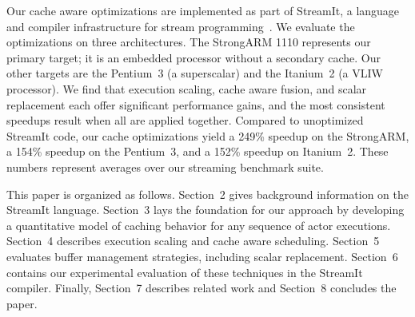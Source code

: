 \documentclass{sigplanconf}
\begin{document}
Our cache aware optimizations are implemented as part of StreamIt, a
language and compiler infrastructure for stream
programming~\cite{streamitcc}.  We evaluate the optimizations on three
architectures.  The StrongARM 1110 represents our primary target; it
is an embedded processor without a secondary cache.  Our other targets
are the Pentium~3 (a superscalar) and the Itanium~2 (a VLIW
processor).  We find that execution scaling, cache aware fusion, and
scalar replacement each offer significant performance gains, and the
most consistent speedups result when all are applied together.
Compared to unoptimized StreamIt code, our cache optimizations yield a
249\% speedup on the StrongARM, a 154\% speedup on the Pentium~3, and
a 152\% speedup on Itanium~2.  These numbers represent averages over
our streaming benchmark suite.

This paper is organized as follows.  Section~2 gives background
information on the StreamIt language.  Section~3 lays the foundation
for our approach by developing a quantitative model of caching
behavior for any sequence of actor executions.  Section~4 describes
execution scaling and cache aware scheduling.  Section~5 evaluates
buffer management strategies, including scalar replacement.  Section~6
contains our experimental evaluation of these techniques in the
StreamIt compiler.  Finally, Section~7 describes related work and
Section~8 concludes the paper.

\end{document}
